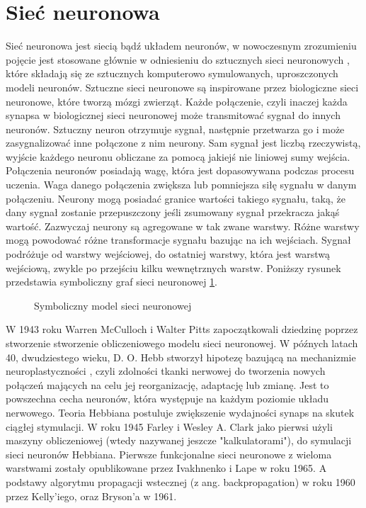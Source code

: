 \section{Sieć neuronowa}

Sieć neuronowa \cite{NeuralNetwork} \cite{ArtificialNeuralNetwork} \cite{DeepLearningFromScratch} \cite{HandsOnMachineLearning} jest siecią bądź układem neuronów, w nowoczesnym zrozumieniu pojęcie jest stosowane głównie w odniesieniu do sztucznych sieci neuronowych , które składają się ze sztucznych komputerowo symulowanych, uproszczonych modeli neuronów. Sztuczne sieci neuronowe są inspirowane przez biologiczne sieci neuronowe, które tworzą mózgi zwierząt.
Każde połączenie, czyli inaczej każda synapsa w biologicznej sieci neuronowej może transmitować sygnał do innych neuronów. Sztuczny neuron otrzymuje sygnał, następnie przetwarza go i może zasygnalizować inne połączone z nim neurony. Sam sygnał jest liczbą rzeczywistą, wyjście każdego neuronu obliczane za pomocą jakiejś nie liniowej sumy wejścia. Połączenia neuronów posiadają wagę, która jest dopasowywana podczas procesu uczenia. Waga danego połączenia zwiększa lub pomniejsza siłę sygnału w danym połączeniu. Neurony mogą posiadać granice wartości takiego sygnału, taką, że dany sygnał zostanie przepuszczony jeśli zsumowany sygnał przekracza jakąś wartość. Zazwyczaj neurony są agregowane w tak zwane warstwy. Różne warstwy mogą powodować różne transformacje sygnału bazując na ich wejściach. Sygnał podróżuje od warstwy wejściowej, do ostatniej warstwy, która jest warstwą wejściową, zwykle po przejściu kilku wewnętrznych warstw. Poniższy rysunek przedstawia symboliczny graf sieci neuronowej \ref{img:nn_symbolic_diagram}.


\begin{figure}[h]
    \centering
    \caption{Symboliczny model sieci neuronowej \cite{ColoredNeuralNetwork}}
    \label{img:nn_symbolic_diagram}
\end{figure}


\clearpage


W 1943 roku Warren McCulloch i Walter Pitts zapoczątkowali dziedzinę poprzez stworzenie stworzenie obliczeniowego modelu sieci neuronowej. W późnych latach 40, dwudziestego wieku, D. O. Hebb stworzył hipotezę bazującą na mechanizmie neuroplastyczności \cite{Neuroplastycznosc}, czyli zdolności tkanki nerwowej do tworzenia nowych połączeń mających na celu jej reorganizację, adaptację lub zmianę. Jest to powszechna cecha neuronów, która występuje na każdym poziomie układu nerwowego. Teoria Hebbiana postuluje zwiększenie wydajności synaps na skutek ciągłej stymulacji. W roku 1945 Farley i Wesley A. Clark jako pierwsi użyli maszyny obliczeniowej (wtedy nazywanej jeszcze "kalkulatorami"), do symulacji sieci neuronów Hebbiana. Pierwsze funkcjonalne sieci neuronowe z wieloma warstwami zostały opublikowane przez Ivakhnenko i Lape w roku 1965. A podstawy algorytmu propagacji wstecznej (z ang. backpropagation) w roku 1960 przez Kelly'iego, oraz Bryson'a w 1961.

